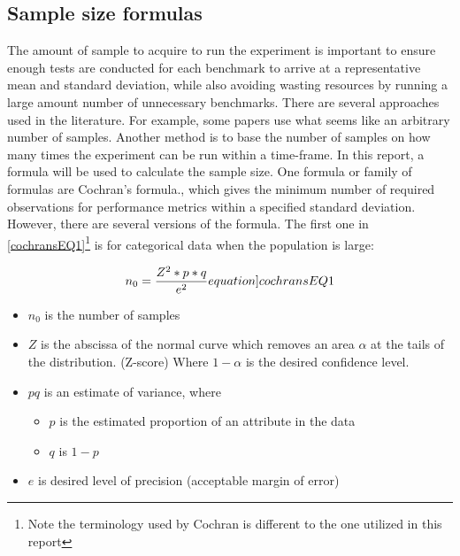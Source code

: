 \subsection{Sample size formulas}
The amount of sample to acquire to run the experiment is important to ensure enough tests are conducted for each benchmark to arrive at a representative mean and standard deviation, while also avoiding wasting resources by running a large amount number of unnecessary benchmarks. There are several approaches used in the literature. For example, some papers use what seems like an arbitrary number of samples\cite{Pereira2017,Koedijk2022diff,Georgiou2020}. Another method is to base the number of samples on how many times the experiment can be run within a time-frame\cite{sestoft2013microbenchmarks}. In this report, a formula will be used to calculate the sample size. One formula or family of formulas are Cochran's formula.\cite{Cochran, kotrlik2001organizational,israel1992determining}, which gives the minimum number of required observations for performance metrics within a specified standard deviation. However, there are several versions of the formula.
The first one in \cref{cochransEQ1}\footnote{Note the terminology used by Cochran is different to the one utilized in this report} is for categorical data when the population is large\cite{israel1992determining}:

\begin{equation}
    n_0 = \frac{Z^2*p*q}{e^2}
    \label[equation]{cochransEQ1}
\end{equation}

\begin{itemize}
    \item $n_0$ is the number of samples
    \item $Z$ is the abscissa of the normal curve which removes an area $\alpha$ at the tails of the distribution. (Z-score) Where $1 - \alpha$ is the desired confidence level.%
    \item $pq$ is an estimate of variance, where
    \begin{itemize}
        \item $p$ is the estimated proportion of an attribute in the data
        \item $q$ is $1 - p$
    \end{itemize}
    \item $e$ is desired level of precision (acceptable margin of error)
\end{itemize}


